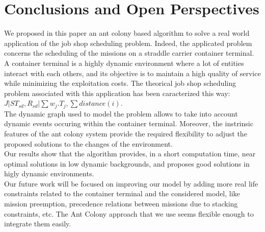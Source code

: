 \documentclass[review]{elsarticle}
\begin{document}


\section{Conclusions and Open Perspectives}

We proposed in this paper an ant colony based algorithm to solve a real world application of the job shop scheduling problem. Indeed, the applicated problem concerns the scheduling of the missions on a straddle carrier container terminal. A container terminal is a highly dynamic environment where a lot of entities interact with each others, and its objective is to maintain a high quality of service while minimizing the exploitation costs. The theorical job shop scheduling problem associated with this application has been caracterized this way: ${ J|ST_{sd}, R_{sd}|\sum w_j.T_{j} , \sum distance(i)}$.\\

The dynamic graph used to model the problem allows to take into account dynamic events occuring within the container terminal. Moreover, the instrinsic features of the ant colony system provide the required flexibility to adjust the proposed solutions to the changes of the environment.\\

Our results show that the algorithm provides, in a short computation time, near optimal solutions in low dynamic backgrounds, and proposes good solutions in higly dynamic environments.\\

Our future work will be focused on improving our model by adding more real life constraints related to the container terminal and the considered model, like mission preemption, precedence relations between missions due to stacking constraints, etc. The Ant Colony approach that we use seems flexible enough to integrate them easily.
\end{document}
